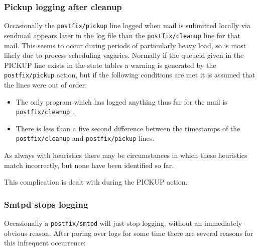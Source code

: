 \documentclass[a4paper,12pt,draft]{article}
\newcommand{\daemon}[1]{%
    \texttt{postfix/#1}%
}
\begin{document}
\subsubsection{Pickup logging after cleanup}

\label{pickup logging after cleanup}

Occasionally the \daemon{pickup} line logged when mail is submitted locally
via sendmail appears later in the log file than the \daemon{cleanup} line
for that mail.  This seems to occur during periods of particularly heavy
load, so is most likely due to process scheduling vagaries.  Normally if
the queueid given in the PICKUP line exists in the state tables a warning
is generated by the \daemon{pickup} action, but if the following conditions
are met it is assumed that the lines were out of order:

\begin{itemize}

    \item The only program which has logged anything thus far for the mail
        is \daemon{cleanup}.

    \item There is less than a five second difference between the
        timestamps of the \daemon{cleanup} and \daemon{pickup} lines.

\end{itemize}

As always with heuristics there may be circumstances in which these
heuristics match incorrectly,  but none have been identified so far.

This complication is dealt with during the PICKUP action.

\subsubsection{Smtpd stops logging}

\label{smtpd stops logging}

Occasionally a \daemon{smtpd} will just stop logging, without an
immediately obvious reason.  After poring over logs for some time there are
several reasons for this infrequent occurrence:
\end{document}
